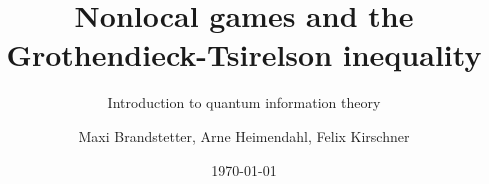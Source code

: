 

		\author{Maxi Brandstetter, Arne Heimendahl, Felix Kirschner}
		\title{Nonlocal games and the Grothendieck-Tsirelson inequality}
		\subtitle{Introduction to quantum information theory}
			\date{\today}
		\begin{frame}
		\maketitle
	\end{frame}
	
		
	
	

	
	


